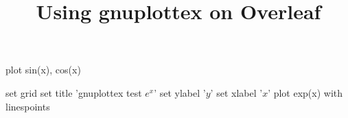 \documentclass[a4paper]{article}
\title{Using gnuplottex on Overleaf}
\begin{document}
\begin{gnuplot}[terminal=pdf,terminaloptions={font ",10" linewidth 3}]
	plot sin(x), cos(x)
\end{gnuplot}

\begin{gnuplot}[scale=0.8]
	set grid
	set title 'gnuplottex test $e^x$'
	set ylabel '$y$'
	set xlabel '$x$'
	plot exp(x) with linespoints
\end{gnuplot}

\end{document}
